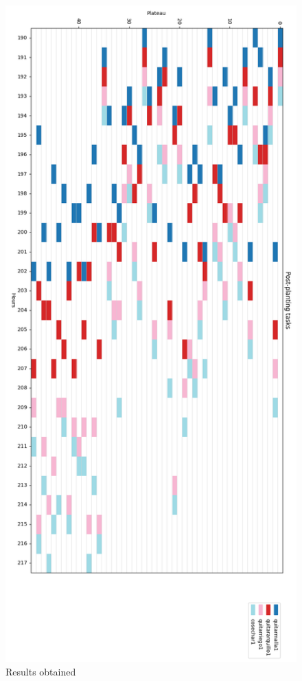 \begin{figure}[ht!]
    \centering
    \includegraphics[scale=0.4]{img/grafico_post_siembra1.png}
    \caption{Results obtained}
    \label{fig:resultados_post1}
\end{figure}


